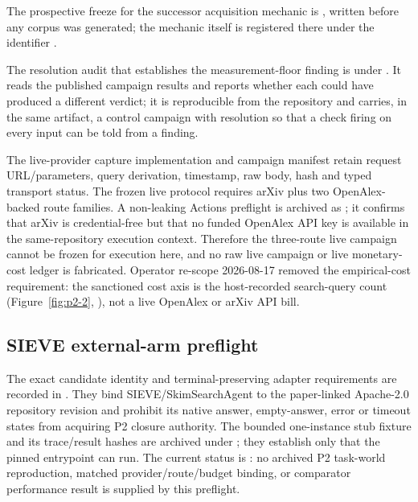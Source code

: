 The prospective freeze for the successor acquisition mechanic is
, written before
any corpus was generated; the mechanic itself is registered there under the
identifier .

The resolution audit that establishes the measurement-floor finding is under
.  It reads the published campaign results and reports
whether each could have produced a different verdict; it is reproducible from
the repository and carries, in the same artifact, a control campaign with
resolution so that a check firing on every input can be told from a finding.

The live-provider capture implementation and campaign manifest retain request
URL/parameters, query derivation, timestamp, raw body, hash and typed transport
status.  The frozen live protocol requires arXiv plus two OpenAlex-backed route
families.  A non-leaking Actions preflight is archived as
; it confirms
that arXiv is credential-free but that no funded OpenAlex API key is
available in the same-repository execution context.  Therefore the three-route
live campaign cannot be frozen for execution here, and no raw live
campaign or live monetary-cost ledger is fabricated.  Operator re-scope
2026-08-17 removed the empirical-cost requirement: the sanctioned cost axis
is the host-recorded search-query count
(Figure~\ref{fig:p2-2}, ),
not a live OpenAlex or arXiv API bill.

\subsection*{SIEVE external-arm preflight}

The exact candidate identity and terminal-preserving adapter requirements are
recorded in
. They bind
SIEVE/SkimSearchAgent to the paper-linked Apache-2.0 repository revision
 and prohibit its native
answer, empty-answer, error or timeout states from acquiring P2 closure
authority. The bounded one-instance stub fixture and its trace/result hashes are
archived under
; they establish only
that the pinned entrypoint can run. The current status is
: no archived P2 task-world
reproduction, matched provider/route/budget binding, or comparator performance
result is supplied by this preflight.

